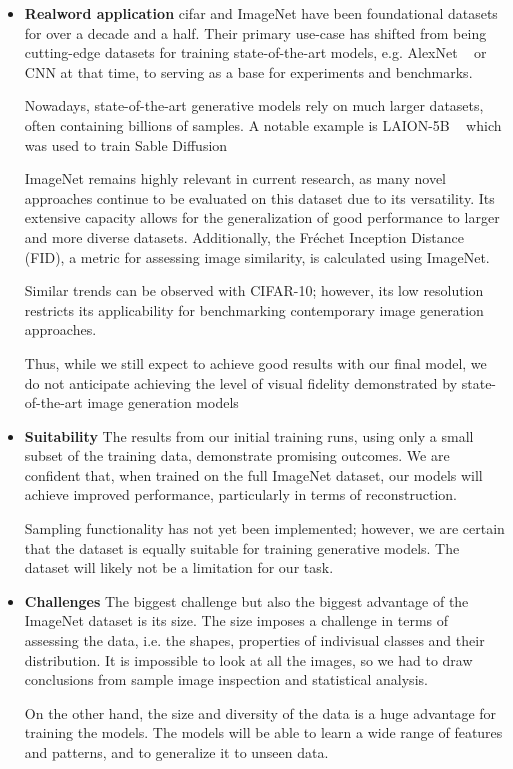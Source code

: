 \begin{itemize}
    \item \textbf{Realword application} \ac{cifar} and ImageNet have been foundational datasets for over a decade and a half.
    Their primary use-case has shifted from being cutting-edge datasets for training state-of-the-art models, e.g. AlexNet ~\cite{AlexNet} or CNN at that time,
    to serving as a base for experiments and benchmarks.
    
    Nowadays, state-of-the-art generative models rely on much larger datasets, often containing billions of samples. A notable example is LAION-5B ~\cite{laion5b} which was used to train Sable Diffusion ~\cite{stable_diff}
    
    ImageNet remains highly relevant in current research, as many novel approaches continue to be evaluated on this dataset due to its versatility. Its extensive capacity allows for the generalization of good performance to larger and more diverse datasets. Additionally, the Fréchet Inception Distance (FID), a metric for assessing image similarity, is calculated using ImageNet.
    
    Similar trends can be observed with CIFAR-10; however, its low resolution restricts its applicability for benchmarking contemporary image generation approaches.
    
    Thus, while we still expect to achieve good results with our final model, we do not anticipate achieving the level of visual fidelity demonstrated by state-of-the-art image generation models

    \item \textbf{Suitability} The results from our initial training runs, using only a small subset of the training data, demonstrate promising outcomes. We are confident that, when trained on the full ImageNet dataset, our models will achieve improved performance, particularly in terms of reconstruction.

    Sampling functionality has not yet been implemented; however, we are certain that the dataset is equally suitable for training generative models. The dataset will likely not be a limitation for our task.

    \item \textbf{Challenges} The biggest challenge but also the biggest advantage of the ImageNet dataset is its size. The size imposes a challenge in terms of assessing the data, i.e. the shapes, properties of indivisual classes and their distribution. It is impossible to look at all the images, so we had to draw conclusions from sample image inspection and statistical analysis.
    
    On the other hand, the size and diversity of the data is a huge advantage for training the models. The models will be able to learn a wide range of features and patterns, and to generalize it to unseen data.
\end{itemize}


